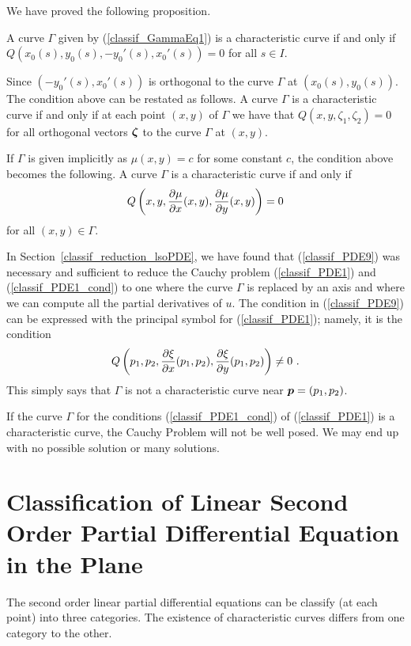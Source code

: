 We have proved the following proposition.

\begin{prop}
A curve $\Gamma$ given by (\ref{classif_GammaEq1}) is a characteristic
curve if and only if
$\displaystyle Q(x_0(s),y_0(s), -y_0'(s) , x_0'(s)) = 0$
for all $s \in I$.
\end{prop}

Since $\displaystyle \left(-y_0'(s) , x_0'(s)\right)$ is orthogonal
to the curve $\Gamma$ at $\displaystyle \left(x_0(s), y_0(s)\right)$.
The condition above can be restated as follows.
A curve $\Gamma$ is a characteristic curve if and only if
at each point $(x,y)$ of $\Gamma$ we have that
$Q(x,y, \zeta_1 , \zeta_2) = 0$ for all orthogonal vectors
${\bm{\zeta}}$ to the curve $\Gamma$ at $(x,y)$.

If $\Gamma$ is given implicitly as $\mu(x,y) = c$ for some constant
$c$, the condition above becomes the following.
A curve $\Gamma$ is a characteristic curve if and only if
\[
Q\left(x,y, \frac{\partial{\mu}}{\partial x}(x,y), \frac{\partial{\mu}}{\partial y}(x,y) \right) = 0
\]
for all $(x,y) \in \Gamma$.

In Section~\ref{classif_reduction_lsoPDE}, we have found that
(\ref{classif_PDE9}) was necessary and sufficient to reduce
the Cauchy problem (\ref{classif_PDE1}) and (\ref{classif_PDE1_cond}) to
one where the curve $\Gamma$ is replaced by an axis and where we can
compute all the partial derivatives of $u$.  The condition in
(\ref{classif_PDE9}) can be expressed with the principal symbol for
(\ref{classif_PDE1}); namely, it is the condition
\[
Q\left(p_1,p_2, \frac{\partial{\xi}}{\partial x}(p_1,p_2), \frac{\partial{\xi}}{\partial y}(p_1,p_2) \right)
\neq 0 \ .
\]
This simply says that $\Gamma$ is not a characteristic curve near
${\bm{p}} = (p_1,p_2)$.

If the curve $\Gamma$ for the conditions (\ref{classif_PDE1_cond}) of
(\ref{classif_PDE1}) is a characteristic curve, the Cauchy Problem will
not be well posed.  We may end up with no possible solution or many
solutions.

\section{Classification of Linear Second Order Partial
Differential Equation in the Plane} \label{classif_class_plane}

The second order linear partial differential equations can be classify
(at each point) into three categories.  The existence of
characteristic curves differs from one category to the other.

